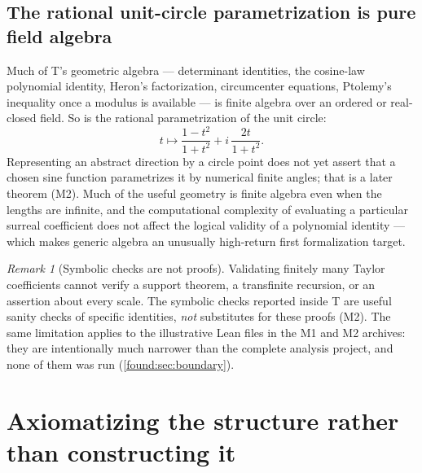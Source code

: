 \documentclass[11pt,letterpaper]{article}
\numberwithin{equation}{section}
\theoremstyle{definition}
\theoremstyle{remark}
\newtheorem{remark}[theorem]{Remark}
\begin{document}
\subsection{The rational unit-circle parametrization is pure field algebra}
\label{found:sub:rationalcircle}
Much of T's geometric algebra --- determinant identities, the cosine-law
polynomial identity, Heron's factorization, circumcenter equations, Ptolemy's
inequality once a modulus is available --- is finite algebra over an ordered or
real-closed field. So is the rational parametrization of the unit circle:
\begin{equation}\label{found:eq:rationalcircle}
 t\longmapsto\frac{1-t^2}{1+t^2}+i\,\frac{2t}{1+t^2}.
\end{equation}
Representing an abstract direction by a circle point does not yet assert that a
chosen sine function parametrizes it by numerical finite angles; that is a later
theorem (M2). Much of the useful geometry is finite algebra even when the
lengths are infinite, and the computational complexity of evaluating a
particular surreal coefficient does not affect the logical validity of a
polynomial identity --- which makes generic algebra an unusually high-return
first formalization target.

\begin{remark}[Symbolic checks are not proofs]\label{found:rem:symbolic}
Validating finitely many Taylor coefficients cannot verify a support theorem, a
transfinite recursion, or an assertion about every scale. The symbolic checks
reported inside T are useful sanity checks of specific identities, \emph{not}
substitutes for these proofs (M2). The same limitation applies to the
illustrative Lean files in the M1 and M2 archives: they are intentionally much
narrower than the complete analysis project, and none of them was run
(\cref{found:sec:boundary}).
\end{remark}

\section{Axiomatizing the structure rather than constructing it}
\label{found:sec:axioms}
\end{document}
